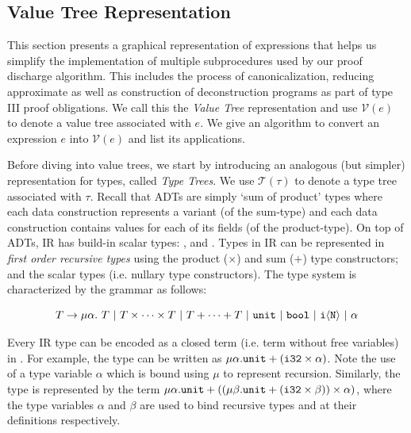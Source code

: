 \subsection{Value Tree Representation}
\label{sec:valuegraph}
This section presents a graphical representation of expressions that helps us simplify the
implementation of multiple subprocedures used by our proof discharge algorithm.
This includes the process of canonicalization, reducing approximate \recursiveRelations{} as well as
construction of deconstruction programs as part of type III proof obligations.
We call this the {\em Value Tree} representation and use $\mathcal{V}(e)$ to denote a value tree associated with $e$.
We give an algorithm to convert an expression $e$ into $\mathcal{V}(e)$ and list its applications.

Before diving into value trees, we start by introducing an analogous (but simpler) representation for types, called {\em Type Trees}.
We use $\mathcal{T}(\tau)$ to denote a type tree associated with $\tau$.
Recall that ADTs are simply `sum of product' types where each data construction represents a variant (of the sum-type) and
each data construction contains values for each of its fields (of the product-type).
On top of ADTs, IR has build-in scalar types: ,  and .
Types in IR can be represented in {\em first order recursive types} \cite{recursivetypestrees} using the product ($\times$) and sum ($+$) type
constructors; and the scalar types (i.e. nullary type constructors).
The type system is characterized by the grammar \typegrammar{} as follows:

$$
T \rightarrow \mu \alpha. \ T \ |\ T \times \dots \times T \ |\  T + \dots + T \ |\  \type{unit} \ |\ \type{bool} \ |\  \type{i\langle N \rangle} \ |\ \alpha
$$

Every IR type can be encoded as a closed term (i.e. term without free variables) in \typegrammar{}.
For example, the  type can be written as $\mu \alpha. {\tt unit} + ({\tt i32} \times \alpha)$.
Note the use of a type variable $\alpha$ which is bound using $\mu$ to represent recursion.
Similarly, the  type is represented by the term
$\mu \alpha. {\tt unit} + ((\mu \beta. {\tt unit} + ({\tt i32} \times \beta)) \times \alpha)$,
where the type variables $\alpha$ and $\beta$ are used to bind recursive types  and 
at their definitions respectively.



